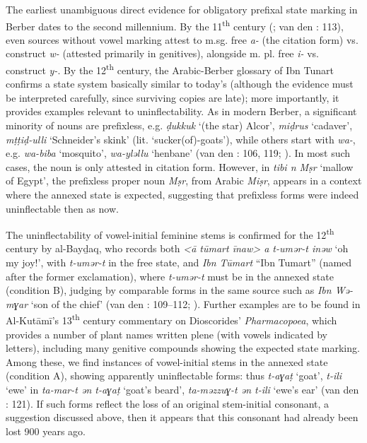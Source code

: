 \documentclass[output=paper]{langscibook}
\begin{document}
\begin{styleStandarduser}
The earliest unambiguous direct evidence for obligatory prefixal state marking in Berber dates to the second millennium. By the 11\textsuperscript{th} century (\citealt{Chaker1981}; van den \citealt{Boogert1997}: 113), even sources without vowel marking attest to m.sg. free \textit{a-} (the citation form) vs. construct \textit{w-} (attested primarily in genitives), alongside m. pl. free \textit{i-} vs. construct \textit{y-}. By the 12\textsuperscript{th} century, the Arabic-Berber glossary of Ibn Tunart confirms a state system basically similar to today’s (although the evidence must be interpreted carefully, since surviving copies are late); more importantly, it provides examples relevant to uninflectability. As in modern Berber, a significant minority of nouns are prefixless, e.g. \textit{ḍukkuk} ‘(the star) Alcor’, \textit{miḍrus} ‘cadaver’, \textit{mṭṭiḍ-ulli} ‘Schneider’s skink’ (lit. ‘sucker(of)-goats’), while others start with \textit{wa-}, e.g. \textit{wa-biba} ‘mosquito’, \textit{wa-yləllu} ‘henbane’ (van den \citealt{Boogert1997}: 106, 119; \citealt{Amennou2021}). In most such cases, the noun is only attested in citation form. However, in \textit{tibi n Mṣr} ‘mallow of Egypt’, the prefixless proper noun \textit{Mṣr}, from Arabic \textit{Miṣr}, appears in a context where the annexed state is expected, suggesting that prefixless forms were indeed uninflectable then as now.
\end{styleStandarduser}

\begin{styleStandarduser}
The uninflectability of vowel-initial feminine stems is confirmed for the 12\textsuperscript{th} century by al-Bayḏaq, who records both \textit{<ā tūmart īnaw> a t-umər-t inəw} ‘oh my joy!’, with \textit{t-umər-t} in the free state, and \textit{Ibn Tūmart} “Ibn Tumart” (named after the former exclamation), where \textit{t-umər-t} must be in the annexed state (condition B), judging by comparable forms in the same source such as \textit{Ibn Wə-mɣar} ‘son of the chief’ (van den \citealt{Boogert1997}: 109–112; \citealt{Marcy1932}). Further examples are to be found in Al-Kutāmī’s 13\textsuperscript{th} century commentary on Dioscorides’ \textit{Pharmacopoea}, which provides a number of plant names written plene (with vowels indicated by letters), including many genitive compounds showing the expected state marking. Among these, we find instances of vowel-initial stems in the annexed state (condition A), showing apparently uninflectable forms: thus \textit{t-aɣaṭ} ‘goat’, \textit{t-ili} ‘ewe’ in \textit{ta-mar-t ən t-aɣaṭ} ‘goat’s beard’, \textit{ta-məzzuɣ-t ən t-ili} ‘ewe’s ear’ (van den \citealt{Boogert1997}: 121). If such forms reflect the loss of an original stem-initial consonant, a suggestion discussed above, then it appears that this consonant had already been lost 900 years ago.
\end{styleStandarduser}
\end{document}
